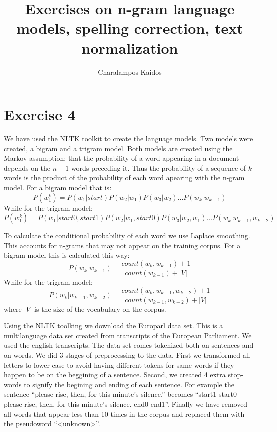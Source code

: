 \documentclass[a4paper]{article}
\begin{document}
\title{Exercises on n-gram language models, spelling correction, text normalization}
\author{Charalampos Kaidos}

\maketitle

\section*{Exercise 4}

We have used the NLTK toolkit to create the language models. Two models were
created, a bigram and a trigram model. Both models are created using the Markov
assumption; that the probability of a word appearing in a document depends on
the $n-1$ words preceding it. Thus the probability of a sequence of $k$ words is
the product of the probability of each word apearing with the n-gram model. For
a bigram model that is:
$$
P(w_1^k) = P(w_1|start)P(w_2|w_1)P(w_3|w_2)\ldots P(w_k|w_{k-1})
$$
While for the trigram model:
$$
P(w_1^k) =
P(w_1|start0,start1)P(w_2|w_1,start0)P(w_3|w_2,w_1)\ldots P(w_k|w_{k-1},w_{k-2})
$$ 

To calculate the conditional probability of each word we use Laplace smoothing.
This accounts for n-grams that may not appear on the training corpus. For a
bigram model this is calculated this way:
$$
P(w_k|w_{k-1}) = \frac{count(w_k,w_{k-1}) + 1}{count(w_{k-1}) + |V|}
$$
While for the trigram model:
$$
P(w_k|w_{k-1},w_{k-2}) = \frac{count(w_k,w_{k-1},w_{k-2}) +
1}{count(w_{k-1},w_{k-2}) + |V|}
$$
where $|V|$ is the size of the vocabulary on the corpus.

Using the NLTK toolking we download the Europarl data set. This is a
multilanguage data set created from transcripts of the European Parliament. We
used the english transcripts. The data set comes tokenized both on sentences and
on words. We did 3 stages of preprocessing to the data. First we transformed all
letters to lower case to avoid having different tokens for same words if they
happen to be on the beggining of a sentence. Second, we created 4 extra
stop-words to signify the begining and ending of each sentence. For example
the sentence ``please rise, then, for this minute's silence.'' becomes
``start1 start0 please rise, then, for this minute's silence. end0 end1''.
Finally we have removed all words that appear less than 10 times in the corpus
and replaced them with the pseudoword ``<unknown>''.
\end{document}
